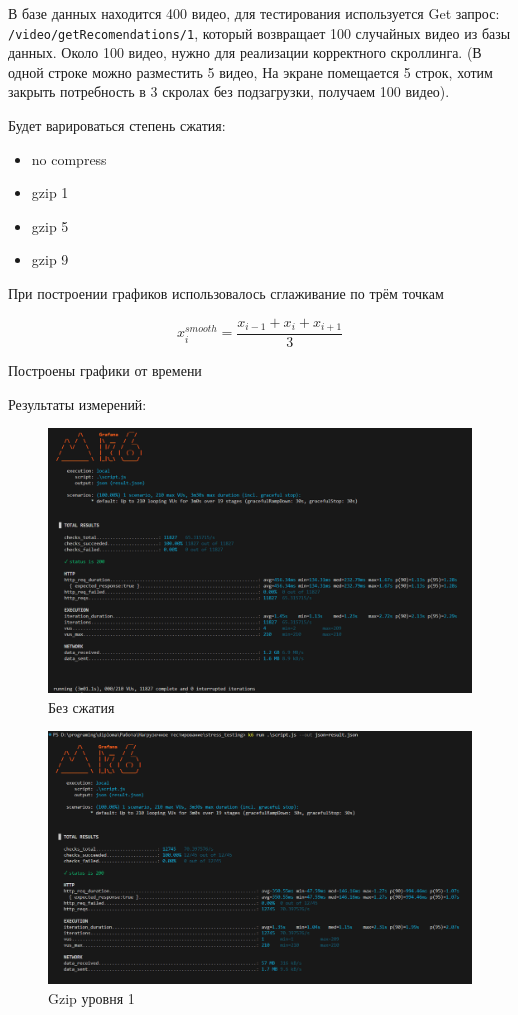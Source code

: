 \documentclass[12pt]{article}
\begin{document}
В базе данных находится 400 видео, для тестирования используется Get запрос:
\verb|/video/getRecomendations/1|, который возвращает 100 случайных видео из базы данных. Около 100 видео, нужно для реализации корректного
скроллинга. (В одной строке можно разместить 5 видео, На экране помещается 5 строк, хотим закрыть
потребность в 3 скролах без подзагрузки, получаем 100 видео).

Будет варироваться степень сжатия:
\begin{itemize}
    \item no compress
    \item gzip 1
    \item gzip 5
    \item gzip 9
\end{itemize}

При построении графиков использовалось сглаживание по трём точкам

\[
    x^{smooth}_{i} = \frac{x_{i-1} + x_{i} + x_{i+1}}{3}
\]

Построены графики от времени

Результаты измерений:

\begin{figure}[H]
    \centering
    \includegraphics[width=1\textwidth]{../images/second_part/no_compress_screenshot.png}
    \caption{Без сжатия}
\end{figure}

\begin{figure}[H]
    \centering
    \includegraphics[width=1\textwidth]{../images/second_part/gzip1_screenshot.png}
    \caption{Gzip уровня 1}
\end{figure}
\end{document}
